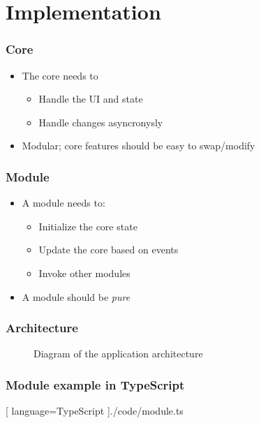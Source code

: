 \section{Implementation}
\SectionPage

\begin{frame}
  \frametitle{Core}
  \begin{itemize}
    \pause
    \item The core needs to
      \pause
      \begin{itemize}
        \item Handle the UI and state
        \pause
        \item Handle changes asyncronysly
      \end{itemize}
    \pause
    \item Modular; core features should be easy to swap/modify
  \end{itemize}
\end{frame}

\begin{frame}
  \frametitle{Module}
  \begin{itemize}
    \pause
    \item A module needs to:
      \pause
      \begin{itemize}
        \item Initialize the core state
        \pause
        \item Update the core based on events
        \pause
        \item Invoke other modules
      \end{itemize}
      \pause
    \item A module should be \textit{pure}
  \end{itemize}
\end{frame}

\begin{frame}
  \frametitle{Architecture}
  \begin{figure}[H]
    \centering
    
    \caption{
      Diagram of the application architecture
    }
  \end{figure}
\end{frame}

\begin{frame}
  \frametitle{Module example in TypeScript}
  \begin{center}
    
    [ language=TypeScript
    ]{./code/module.ts}
  \end{center}
\end{frame}

